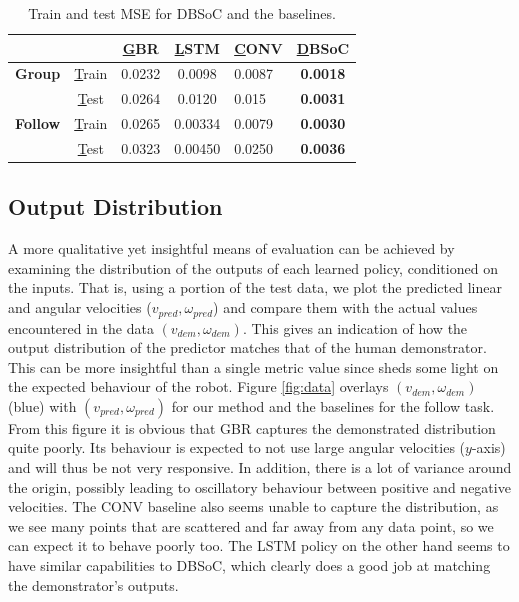 \documentclass[letterpaper, 10 pt, conference]{ieeeconf}
\begin{document}

\begin{table}[h]
\centering

\begin{tabular}{|c|c|c|c|l|c|}
\hline
                &             & {\ul GBR} & {\ul LSTM} & {\ul CONV} & {\ul DBSoC} \\ \hline
\textbf{Group}  & {\ul Train} & 0.0232     & 0.0098      & 0.0087     & \textbf{0.0018}  \\ \hline
                & {\ul Test}  & 0.0264     & 0.0120      & 0.015    & \textbf{0.0031}  \\ \hline
\textbf{Follow} & {\ul Train} & 0.0265    & 0.00334      & 0.0079     & \textbf{0.0030}  \\ \hline
                & {\ul Test}  & 0.0323     & 0.00450       & 0.0250    & \textbf{0.0036}  \\ \hline
\end{tabular}
\caption{Train and test MSE for DBSoC and the baselines.\label{tab:mse}}
\end{table}


\subsection{Output Distribution}
A more qualitative yet insightful means of evaluation can be achieved by examining the distribution of the outputs of each learned policy, conditioned on the inputs. That is, using a portion of the test data, we plot the predicted linear and angular velocities ($v_{pred},\omega_{pred}$) and compare them with the actual values encountered in the data $(v_{dem},\omega_{dem})$. This gives an indication of how the output distribution of the predictor matches that of the human demonstrator. This can be more insightful than a single metric value since sheds some light on the expected behaviour of the robot. Figure \ref{fig:data} overlays $(v_{dem},\omega_{dem})$ (blue) with $(v_{pred},\omega_{pred})$ for our method and the baselines for the follow task. From this figure it is obvious that GBR captures the demonstrated distribution quite poorly. Its behaviour is expected to not use large angular velocities ($y$-axis) and will thus be not very responsive. In addition, there is a lot of variance around the origin, possibly leading to oscillatory behaviour between positive and negative velocities. The CONV baseline also seems unable to capture the distribution, as we see many points that are scattered and far away from any data point, so we can expect it to behave poorly too. The LSTM policy on the other hand seems to have similar capabilities to DBSoC, which clearly does a good job at matching the demonstrator's outputs. 
\end{document}
